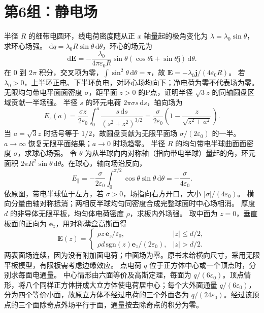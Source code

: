 \section{第6组：静电场}
\problemtext 半径 $R$ 的细带电圆环，线电荷密度随从正 $x$ 轴量起的极角变化为 $\lambda=\lambda_0\sin\theta$，求环心场强。
\workings $\mathrm dq=\lambda_0R\sin\theta\,\mathrm d\theta$，环心的场元为
\[
\mathrm d\bm E=-\frac{\lambda_0}{4\pi\varepsilon_0R}\sin\theta(\cos\theta\bm i+\sin\theta\bm j)\,\mathrm d\theta.
\]
在 $0$ 到 $2\pi$ 积分，交叉项为零，$\int\sin^2\theta\,\mathrm d\theta=\pi$，故 $\bm E=-\lambda_0\bm j/(4\varepsilon_0R)$。
\crosscheck 若 $\lambda_0>0$，上半环正电、下半环负电，对环心场均向下；净电荷为零不代表场为零。
\problemtext 无限均匀带电平面面密度 $\sigma$，距平面 $z>0$ 的P点，证明半径 $\sqrt3 z$ 的同轴圆盘区域贡献一半场强。
\workings 半径 $s$ 的环元电荷 $2\pi\sigma s\,\mathrm ds$，轴向场为
\[
E_z(a)=\frac{\sigma z}{2\varepsilon_0}\int_0^a\frac{s\,\mathrm ds}{(s^2+z^2)^{3/2}}
=\frac{\sigma}{2\varepsilon_0}\left(1-\frac{z}{\sqrt{z^2+a^2}}\right).
\]
当 $a=\sqrt3z$ 时括号等于 $1/2$，故圆盘贡献为无限平面场 $\sigma/(2\varepsilon_0)$ 的一半。
\crosscheck $a\to\infty$ 恢复无限平面结果；$a\to0$ 时场趋零。
\problemtext 半径 $R$ 的均匀带电半球曲面面密度 $\sigma$，求球心场强。
\workings 令 $\theta$ 为从半球向内对称轴（指向带电半球）量起的角，环元面积 $2\pi R^2\sin\theta\,\mathrm d\theta$。在球心，轴向场沿反向，
\[
E_{\parallel}=-\frac{\sigma}{2\varepsilon_0}\int_0^{\pi/2}\cos\theta\sin\theta\,\mathrm d\theta
=-\frac{\sigma}{4\varepsilon_0}.
\]
依原图，带电半球位于左方，若 $\sigma>0$，场指向右方开口，大小 $|\sigma|/(4\varepsilon_0)$。
\crosscheck 横向分量由轴对称抵消；两相反半球均匀同密度合成完整球面时中心场相消。
\problemtext 厚度 $d$ 的非导体无限平板，均匀体电荷密度 $\rho$，求板内外场强。
\workings 取中面为 $z=0$，垂直板面的正向为 $\bm e_z$，用对称薄盒高斯面得
\[
\bm E(z)=\begin{cases}
\rho z\,\bm e_z/\varepsilon_0,& |z|\le d/2,\\
\rho d\,\mathrm{sgn}(z)\bm e_z/(2\varepsilon_0),& |z|>d/2.
\end{cases}
\]
\crosscheck 两表面场连续，因为没有附加面电荷；中面场为零。原书未给横向尺寸，采用无限平板模型，有限板需考虑边缘效应。
\problemtext 点电荷 $q$ 位于正方体中心或一个顶点时，分别求每面电通量。
\workings 中心情形由六面等价及高斯定理，每面为 $q/(6\varepsilon_0)$。顶点情形，将八个同样正方体拼成大立方体使电荷居中心；每个大外面通量 $q/(6\varepsilon_0)$，分为四个等价小面，故原立方体不经过电荷的三个外面各为 $q/(24\varepsilon_0)$。经过该顶点的三个面除奇点外场平行于面，通量按去除奇点的积分为零。
